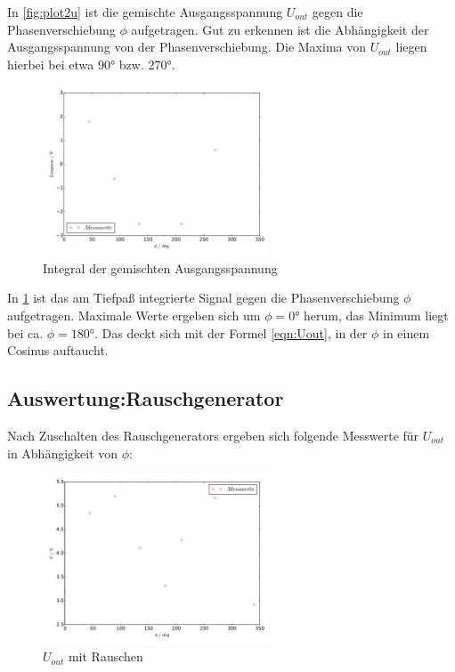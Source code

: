 In \ref{fig:plot2u} ist die gemischte Ausgangsspannung $U_{out}$ gegen die
Phasenverschiebung $\phi$ aufgetragen. Gut zu erkennen ist die Abhängigkeit
der Ausgangsspannung von der Phasenverschiebung. Die Maxima von $U_{out}$
liegen hierbei bei etwa 90° bzw. 270°.

\begin{figure}
  \centering
  \includegraphics[keepaspectratio, width=0.6\textwidth]{plot2low.pdf}
  \caption{Integral der gemischten Ausgangsspannung}
  \label{fig:plot2low}
\end{figure}

In \ref{fig:plot2low} ist das am Tiefpaß integrierte Signal gegen die
Phasenverschiebung $\phi$ aufgetragen. Maximale Werte ergeben sich um $\phi = 0°$
herum, das Minimum liegt bei ca. $\phi = 180°$. Das deckt sich mit der Formel
\eqref{eqn:Uout}, in der $\phi$ in einem Cosinus auftaucht.

\subsection{Auswertung:Rauschgenerator}
Nach Zuschalten des Rauschgenerators ergeben sich folgende Messwerte für
$U_{out}$ in Abhängigkeit von $\phi$:
\begin{figure}
  \centering
  \includegraphics[keepaspectratio, width=0.6\textwidth]{plot3u.pdf}
  \caption{$U_{out}$ mit Rauschen}
  \label{fig:plot3u}
\end{figure}

